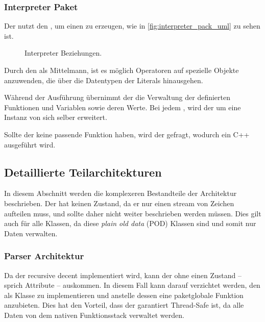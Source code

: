     \subsubsection{Interpreter Paket} %
    \label{sssec:Interpreter Paket}
      Der  nutzt den , um einen  zu erzeugen, wie in \autoref{fig:interpreter_pack_uml} zu sehen ist.

      \begin{figure}[H]
        \centering
        \caption{Interpreter Beziehungen.}
        \label{fig:interpreter_pack_uml}
      \end{figure}

      Durch den  als Mittelmann, ist es möglich Operatoren auf spezielle Objekte anzuwenden, die über die Datentypen der Literals hinausgehen.

      Während der Ausführung übernimmt der  die Verwaltung der definierten Funktionen und Variablen sowie deren Werte. Bei jedem , wird der  um eine Instanz von sich selber erweitert.

      Sollte der  keine passende Funktion haben, wird der  gefragt, wodurch ein C++  ausgeführt wird.

  \subsection{Detaillierte Teilarchitekturen}
  \label{ssec:Detaillierte Teilarchitekturen}
    In diesem Abschnitt werden die komplexeren Bestandteile der Architektur beschrieben. Der  hat keinen Zustand, da er nur einen stream von Zeichen aufteilen muss, und sollte daher nicht weiter beschrieben werden müssen. Dies gilt auch für alle  Klassen, da diese \emph{plain old data} (POD) Klassen sind und somit nur Daten verwalten.

    \subsubsection{Parser Architektur}
    \label{sssec:Parser Architektur}
      Da der  recursive decent implementiert wird, kann der  ohne einen Zustand -- sprich Attribute -- auskommen. In diesem Fall kann darauf verzichtet werden, den  als Klasse zu implementieren und anstelle dessen eine paketglobale Funktion anzubieten. Dies hat den Vorteil, dass der  garantiert Thread-Safe ist, da alle Daten von dem nativen Funktionsstack verwaltet werden.

